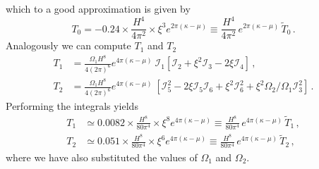 which to a good approximation is given by
\begin{equation}
  T_0 = - 0.24 \times \frac{H^4}{4 \pi^2} \times \xi^3  e^{2 \pi (\kappa - \mu)}  \equiv   \frac{H^4}{4 \pi^2} \, e^{2 \pi (\kappa - \mu)}  \, \tilde T_0 \, .
\end{equation}
Analogously we can compute $T_1$ and $T_2$
\begin{align}
  T_1 & = \frac{\Omega_1 H^8}{ 4 (2\pi)^6} e^{4 \pi (\kappa - \mu)} \  \mathcal{I}_1\left[ \mathcal{I}_2  + \xi^2 \mathcal{I}_3 - 2 \xi \mathcal{I}_4 \right]  \,, \\
T_2 & = \frac{\Omega_1 H^8}{ 4 (2\pi)^6} e^{4 \pi (\kappa - \mu)} \ \left[\mathcal{I}_5^2 - 2 \xi \mathcal{I}_5 \mathcal{I}_6+ \xi^2 \mathcal{I}_6^2 + \xi^2 \Omega_2/\Omega_1 \mathcal{I}_3^2 \right]  \, .
\end{align}
Performing the integrals yields
\begin{align}
  T_1 & \simeq 0.0082 \times \frac{H^8}{80 \pi^4} \times \xi^8  e^{4 \pi (\kappa - \mu)}  \equiv  \frac{H^8}{80 \pi^4} \,  e^{4 \pi (\kappa - \mu)} \, \tilde T_1  \, , \\
  T_2 & \simeq 0.051 \times \frac{H^8}{80 \pi^4} \times  \xi^6 e^{4 \pi (\kappa - \mu)} \equiv  \frac{H^8}{80 \pi^4} \,  e^{4 \pi (\kappa - \mu)} \, \tilde T_2  \, ,
\end{align}
where we have also substituted the values of $\Omega_1$ and $\Omega_2$. 
